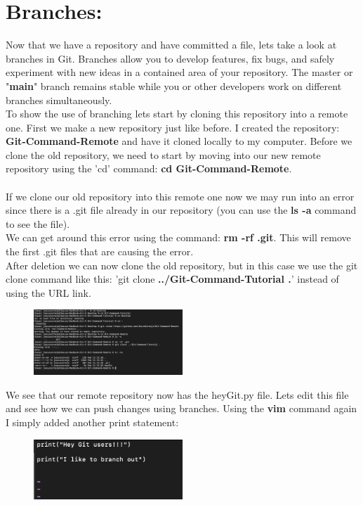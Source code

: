 \documentclass[10pt,twocolumn]{article}
\begin{document}
\section{Branches:}
Now that we have a repository and have committed a file, lets take a look at branches in Git. Branches allow you to develop features, fix bugs, and safely experiment with new ideas in a contained area of your repository. The master or "\textbf{main}" branch remains stable while you or other developers work on different branches simultaneously.\\
To show the use of branching lets start by cloning this repository into a remote one. First we make a new repository just like before. I created the repository: \textbf{Git-Command-Remote} and have it cloned locally to my computer. Before we clone the old repository, we need to start by moving into our new remote repository using the 'cd' command: \textbf{cd Git-Command-Remote}.\\ \\
If we clone our old repository into this remote one now we may run into an error since there is a .git file already in our repository (you can use the \textbf{ls -a} command to see the file).\\
We can get around this error using the command: \textbf{rm -rf .git}. This will remove the first .git files that are causing the error. \\
After deletion we can now clone the old repository, but in this case we use the git clone command like this: 'git clone \textbf{../Git-Command-Tutorial .}' instead of using the URL link. 

\begin{figure}[h!]
\center
\includegraphics[width=0.5\textwidth]{screenshots/sc7.png}
\end{figure} 

We see that our remote repository now has the heyGit.py file. Lets edit this file and see how we can push changes using branches. Using the \textbf{vim} command again I simply added another print statement:
\begin{figure}[h!]
\center
\includegraphics[width=0.5\textwidth]{screenshots/sc8.png}
\end{figure}
\end{document}
